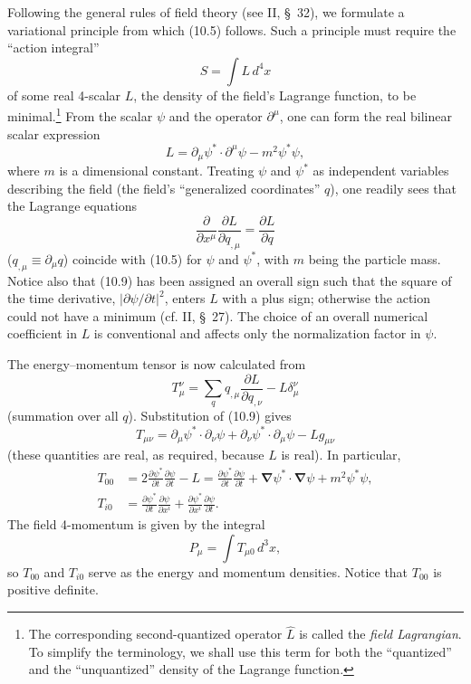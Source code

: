 Following the general rules of field theory (see II, \S~32), we formulate a variational principle from which (10.5) follows. Such a principle must require the ``action integral''
\begin{equation}
S=\int L\,d^4x
\tag{10.8}
\end{equation}
of some real 4-scalar $L$, the density of the field's Lagrange function, to be minimal.\footnote{The corresponding second-quantized operator $\widehat L$ is called the \emph{field Lagrangian}. To simplify the terminology, we shall use this term for both the ``quantized'' and the ``unquantized'' density of the Lagrange function.} From the scalar $\psi$ and the operator $\partial^\mu$, one can form the real bilinear scalar expression
\begin{equation}
L=\partial_\mu\psi^*\cdot\partial^\mu\psi-m^2\psi^*\psi,
\tag{10.9}
\end{equation}
where $m$ is a dimensional constant. Treating $\psi$ and $\psi^*$ as independent variables describing the field (the field's ``generalized coordinates'' $q$), one readily sees that the Lagrange equations
\begin{equation}
\frac{\partial}{\partial x^\mu}\frac{\partial L}{\partial q_{,\mu}}
=\frac{\partial L}{\partial q}
\tag{10.10}
\end{equation}
($q_{,\mu}\equiv\partial_\mu q$) coincide with (10.5) for $\psi$ and $\psi^*$, with $m$ being the particle mass. Notice also that (10.9) has been assigned an overall sign such that the square of the time derivative, $|\partial\psi/\partial t|^2$, enters $L$ with a plus sign; otherwise the action could not have a minimum (cf. II, \S~27). The choice of an overall numerical coefficient in $L$ is conventional and affects only the normalization factor in $\psi$.

The energy--momentum tensor is now calculated from
\begin{equation}
T^\nu_\mu=\sum_q q_{,\mu}\frac{\partial L}{\partial q_{,\nu}}
-L\delta^\nu_\mu
\tag{10.11}
\end{equation}
(summation over all $q$). Substitution of (10.9) gives
\begin{equation}
T_{\mu\nu}=\partial_\mu\psi^*\cdot\partial_\nu\psi
+\partial_\nu\psi^*\cdot\partial_\mu\psi-Lg_{\mu\nu}
\tag{10.12}
\end{equation}
(these quantities are real, as required, because $L$ is real). In particular,
\begin{align}
T_{00}
&=2\frac{\partial\psi^*}{\partial t}\frac{\partial\psi}{\partial t}-L
=\frac{\partial\psi^*}{\partial t}\frac{\partial\psi}{\partial t}
+\boldsymbol{\nabla}\psi^*\cdot\boldsymbol{\nabla}\psi
+m^2\psi^*\psi,
\tag{10.13}\\
T_{i0}
&=\frac{\partial\psi^*}{\partial t}\frac{\partial\psi}{\partial x^i}
+\frac{\partial\psi^*}{\partial x^i}\frac{\partial\psi}{\partial t}.
\tag{10.14}
\end{align}
The field 4-momentum is given by the integral
\begin{equation}
P_\mu=\int T_{\mu0}\,d^3x,
\tag{10.15}
\end{equation}
so $T_{00}$ and $T_{i0}$ serve as the energy and momentum densities. Notice that $T_{00}$ is positive definite.

